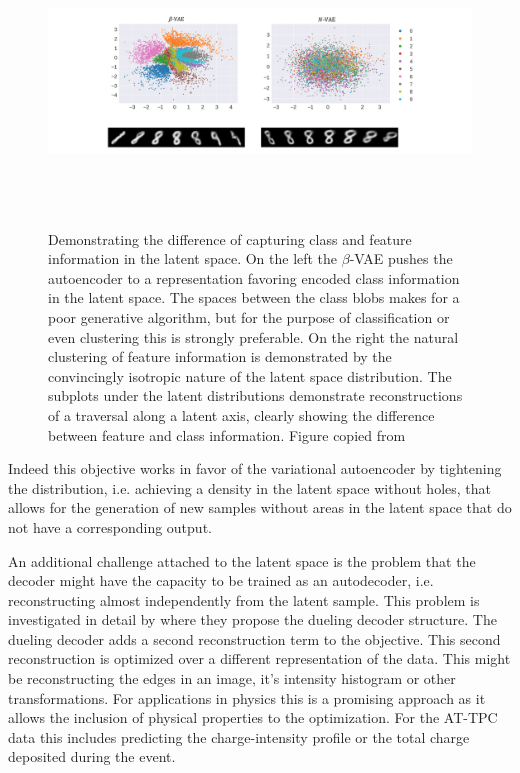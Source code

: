 \begin{figure}
\centering
\includegraphics[width=\textwidth, height=3in]{plots/latent_traversal}
\caption[Difference between generative and discriminative latent spaces]{Demonstrating the difference of capturing class and feature information in the latent space. On the left the $\beta$-VAE pushes the autoencoder to a representation favoring encoded class information in the latent space. The spaces between the class blobs makes for a poor generative algorithm, but for the purpose of classification or even clustering this is strongly preferable. On the right the natural clustering of feature information is demonstrated by the convincingly isotropic nature of the latent space distribution. The subplots under the latent distributions demonstrate reconstructions of a traversal along a latent axis, clearly showing the difference between feature and class information. Figure copied from \citet{Antoran2019}}\label{fig:latent_traversal}
\end{figure}

Indeed this objective works in favor of the variational autoencoder by tightening the distribution, i.e. achieving a density in the latent space without holes, that allows for the generation of new samples without areas in the latent space that do not have a corresponding output. 

An additional challenge attached to the latent space is the problem that the decoder might have the capacity to be trained as an autodecoder, i.e. reconstructing almost independently from the latent sample. This problem is investigated in detail by  where they propose the dueling decoder structure. The dueling decoder adds a second reconstruction term to the objective. This second reconstruction is optimized over a different representation of the data. This might be reconstructing the edges in an image, it's intensity histogram or other transformations. For applications in physics this is a promising approach as it allows the inclusion of physical properties to the optimization. For the AT-TPC data this includes predicting the charge-intensity profile or the total charge deposited during the event.

